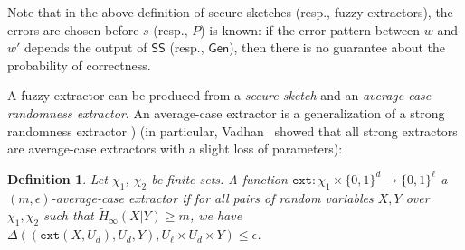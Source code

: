 \documentclass[11pt]{article}
\newcommand{\class}[1]{{\ensuremath{\mathsf{#1}}}}
\newcommand{\gen}{\ensuremath{\class{Gen}}\xspace}
\newcommand{\sketch}{\ensuremath{\class{SS}}\xspace}
\newcommand{\ext}{\ensuremath{\mathtt{ext}}}
\newtheorem{definition}[theorem]{Definition}
\begin{document}
Note that in the above definition of secure sketches (resp., fuzzy extractors), the errors are chosen before $s$ (resp., $P$) is known: if the error pattern between $w$ and $w'$ depends the output of $\sketch$ (resp., $\gen$), then there is no guarantee about the probability of correctness.


A fuzzy extractor can be produced from a \emph{secure sketch} and an \emph{average-case randomness extractor}. An average-case extractor is a generalization of a strong randomness extractor \cite[Definition 2]{nisan1993randomness}) (in particular, Vadhan~\cite[Problem 6.8]{Vad12} showed that all strong extractors are average-case extractors with a slight loss of parameters):

\begin{definition}
Let $\chi_1$, $\chi_2$ be finite sets.
A function $\ext: \chi_1\times \{0,1\}^d \rightarrow \{0,1\}^\ell$ a \emph{$(m, \epsilon)$-average-case extractor} if for all pairs
of random variables $X, Y$ over $\chi_1, \chi_2$ such that
$\tilde{H}_\infty(X|Y) \ge m$, we have $\Delta((\ext(X, U_d), U_d, Y), U_\ell\times
U_d \times Y) \le \epsilon$.
\end{definition}
\end{document}
